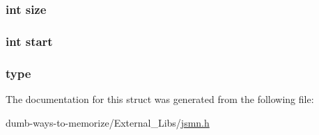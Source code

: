 \subsubsection[{\texorpdfstring{size}{size}}]{\setlength{\rightskip}{0pt plus 5cm}int size}\hypertarget{structjsmntok__t_a439227feff9d7f55384e8780cfc2eb82}{}\label{structjsmntok__t_a439227feff9d7f55384e8780cfc2eb82}
\subsubsection[{\texorpdfstring{start}{start}}]{\setlength{\rightskip}{0pt plus 5cm}int start}\hypertarget{structjsmntok__t_a37722a150250e2a5a98e5e0d11e53449}{}\label{structjsmntok__t_a37722a150250e2a5a98e5e0d11e53449}
\subsubsection[{\texorpdfstring{type}{type}}]{ type}\hypertarget{structjsmntok__t_a7def41ebc3980f6e4526819b42c2721f}{}\label{structjsmntok__t_a7def41ebc3980f6e4526819b42c2721f}


The documentation for this struct was generated from the following file\+:\begin{DoxyCompactItemize}
\item 
dumb-\/ways-\/to-\/memorize/\+External\+\_\+\+Libs/\hyperlink{jsmn_8h}{jsmn.\+h}\end{DoxyCompactItemize}
